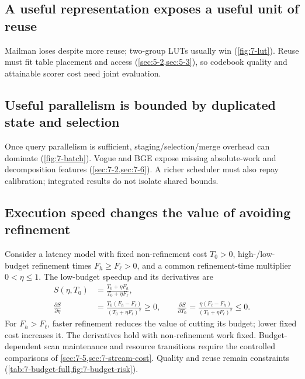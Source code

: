 \subsection{A useful representation exposes a useful unit of reuse}

Mailman loses despite more reuse; two-group LUTs usually win (\cref{fig:7-lut}). Reuse must fit table placement and access (\cref{sec:5-2,sec:5-3}), so codebook quality and attainable scorer cost need joint evaluation.

\subsection{Useful parallelism is bounded by duplicated state and selection}

Once query parallelism is sufficient, staging/selection/merge overhead can dominate (\cref{fig:7-batch}). Vogue and BGE expose missing absolute-work and decomposition features (\cref{sec:7-2,sec:7-6}). A richer scheduler must also repay calibration; integrated results do not isolate shared bounds.

\subsection{Execution speed changes the value of avoiding refinement}

Consider a latency model with fixed non-refinement cost $T_0>0$,
high-/low-budget refinement times $F_h\geq F_\ell>0$, and a common
refinement-time multiplier $0<\eta\leq1$. The low-budget speedup and
its derivatives are
\begin{align}
 S(\eta,T_0)&=\frac{T_0+\eta F_h}{T_0+\eta F_\ell},
 \label{eq:8-refinement-sensitivity}\\
 \frac{\partial S}{\partial\eta}
 &=\frac{T_0(F_h-F_\ell)}{(T_0+\eta F_\ell)^2}\geq0,\qquad
 \frac{\partial S}{\partial T_0}
 =\frac{\eta(F_\ell-F_h)}{(T_0+\eta F_\ell)^2}\leq0.\nonumber
\end{align}
For $F_h>F_\ell$, faster refinement reduces the value of cutting its
budget; lower fixed cost increases it. The derivatives hold with
non-refinement work fixed. Budget-dependent scan maintenance and
resource transitions require the controlled comparisons of
\cref{sec:7-5,sec:7-stream-cost}. Quality and reuse remain constraints
(\cref{tab:7-budget-full,fig:7-budget-risk}).
